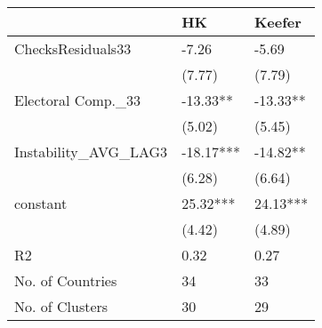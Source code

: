 \begin{tabular}{lll}
  \hline
 & HK & Keefer \\ 
  \hline
ChecksResiduals33 & -7.26 & -5.69 \\ 
   & (7.77) & (7.79) \\ 
  Electoral Comp.\_33 & -13.33** & -13.33** \\ 
   & (5.02) & (5.45) \\ 
  Instability\_AVG\_LAG3 & -18.17*** & -14.82** \\ 
   & (6.28) & (6.64) \\ 
  constant & 25.32*** & 24.13*** \\ 
   & (4.42) & (4.89) \\ 
  R2 & 0.32 & 0.27 \\ 
  No. of Countries & 34 & 33 \\ 
  No. of Clusters & 30 & 29 \\ 
   \hline
\end{tabular}
